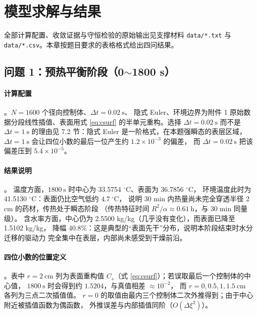 \section{模型求解与结果}

全部计算配置、收敛证据与守恒检验的原始输出见支撑材料 \texttt{data/*.txt} 与
\texttt{data/*.csv}。本章按题目要求的表格格式给出四问结果。

\subsection{问题 1：预热平衡阶段（0$\sim$1800 s）}

\paragraph{计算配置}。$N=1600$ 个径向控制体、$\Delta t=0.02\ \mathrm{s}$、
隐式 Euler、环境边界为附件 1 原始数据分段线性插值、表面用式 \eqref{eq:csurf}
的半单元重构。选择 $\Delta t=0.02\ \mathrm{s}$ 而不是 $\Delta t=1\ \mathrm{s}$
的理由见 7.2 节：隐式 Euler 是一阶格式，在本题强瞬态的表层区域，
$\Delta t=1\ \mathrm{s}$ 会让四位小数的最后一位产生约 $1.2\times10^{-3}$ 的偏差，
而 $\Delta t=0.02\ \mathrm{s}$ 把该偏差压到 $5.4\times10^{-5}$。





\paragraph{结果说明}。
温度方面，$1800\ \mathrm{s}$ 时中心为 33.5754 $^\circ$C、表面为 36.7856 $^\circ$C，
环境温度此时为 41.5130 $^\circ$C：表面仍比空气低约 $4.7\ ^\circ$C，
说明 30 min 内热量尚未完全穿透半径 2 cm 的药材，传热处于瞬态阶段
（传热特征时间 $R^2/\alpha\approx0.61\ \mathrm{h}$，与 30 min 同量级）。
含水率方面，中心仍为 2.5500 kg/kg（几乎没有变化），而表面已降至 1.5102 kg/kg，
降幅 40.8\%：这是典型的“表面先干”分布，说明本阶段结束时水分迁移的驱动力
完全集中在表层，内部尚未感受到干燥前沿。

\paragraph{四位小数的位置定义}。表中 $r=2\ \mathrm{cm}$ 列为表面重构值
$C_s$（式 \eqref{eq:csurf}）；若误取最后一个控制体的中心值，
$1800\ \mathrm{s}$ 时会得到约 $1.5204$，与真值相差 $\approx10^{-2}$，
而 $r=0,0.5,1,1.5\ \mathrm{cm}$ 各列为三点二次插值值。
$r=0$ 的取值由最内三个控制体二次外推得到；由于中心附近被插值函数为偶函数，
外推误差与内部插值同阶（$O(\Delta\xi^2)$）。

